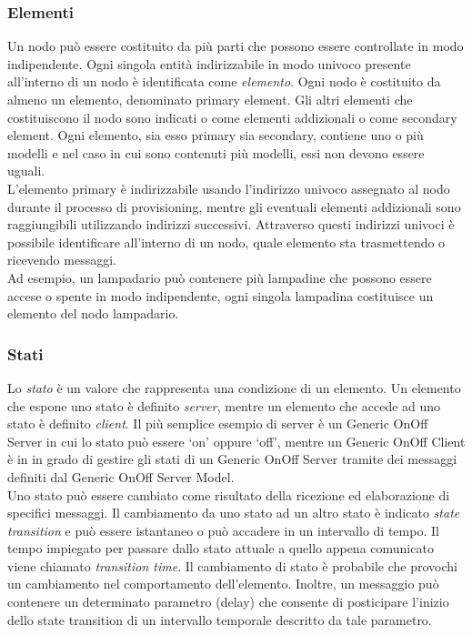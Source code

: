 \subsubsection{Elementi}
\label{subsub:elementi}
Un nodo può essere costituito da più parti che possono essere controllate in modo indipendente. Ogni singola entità indirizzabile in modo univoco presente all'interno di un nodo è identificata come \textit{elemento}. Ogni nodo è costituito da almeno un elemento, denominato primary element. Gli altri elementi che costituiscono il nodo sono indicati o come elementi addizionali o come secondary element. Ogni elemento, sia esso primary sia secondary, contiene uno o più modelli e nel caso in cui sono contenuti più modelli, essi non devono essere uguali.\\
L'elemento primary è indirizzabile usando l'indirizzo univoco assegnato al nodo durante il processo di provisioning, mentre gli eventuali elementi addizionali sono raggiungibili utilizzando indirizzi successivi. Attraverso questi indirizzi univoci è possibile identificare all'interno di un nodo, quale elemento sta trasmettendo o ricevendo messaggi.\\
Ad esempio, un lampadario può contenere più lampadine che possono essere accese o spente in modo indipendente, ogni singola lampadina costituisce un elemento del nodo lampadario.

\subsubsection{Stati}
\label{subsub:stati}
Lo \textit{stato} è un valore che rappresenta una condizione di un elemento. Un elemento che espone uno stato è definito \textit{server}, mentre un elemento che accede ad uno stato è definito \textit{client}. Il più semplice esempio di server è un Generic OnOff Server in cui lo stato può essere `on' oppure `off', mentre un Generic OnOff Client è in in grado di gestire gli stati di un Generic OnOff Server tramite dei messaggi definiti dal Generic OnOff Server Model.\\
Uno stato può essere cambiato come risultato della ricezione ed elaborazione di specifici messaggi. Il cambiamento da uno stato ad un altro stato è indicato \textit{state transition} e può essere istantaneo o può accadere in un intervallo di tempo. Il tempo impiegato per passare dallo stato attuale a quello appena comunicato viene chiamato \textit{transition time}. Il cambiamento di stato è probabile che provochi un cambiamento nel comportamento dell'elemento. Inoltre, un messaggio può contenere un determinato parametro (delay) che consente di posticipare l'inizio dello state transition di un intervallo temporale descritto da tale parametro.\\

